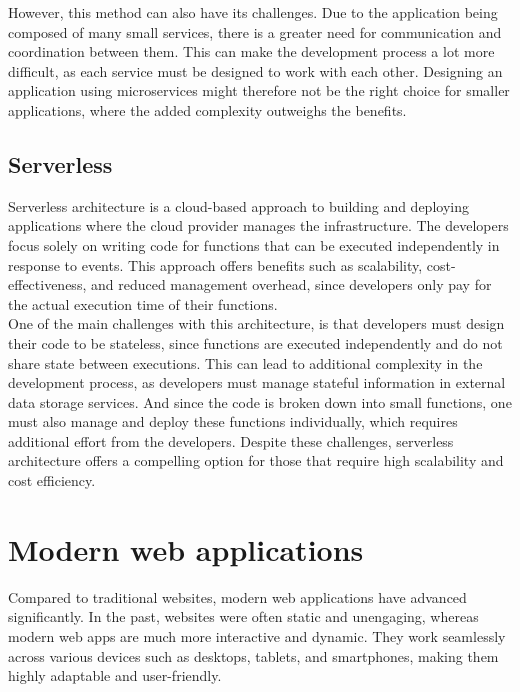 \noindent
However, this method can also have its challenges. Due to the application being composed of many small services, there is a greater need for communication and coordination between them. This can make the development process a lot more difficult, as each service must be designed to work with each other. Designing an application using microservices might therefore not be the right choice for smaller applications, where the added complexity outweighs the benefits.

\subsection{Serverless}
\label{sec:serverless}

\noindent
Serverless architecture is a cloud-based approach to building and deploying applications where the cloud provider manages the infrastructure. The developers focus solely on writing code for functions that can be executed independently in response to events. This approach offers benefits such as scalability, cost-effectiveness, and reduced management overhead, since developers only pay for the actual execution time of their functions. \cite{cassel2022serverless} \\

\noindent
One of the main challenges with this architecture, is that developers must design their code to be stateless, since functions are executed independently and do not share state between executions. This can lead to additional complexity in the development process, as developers must manage stateful information in external data storage services. And since the code is broken down into small functions, one must also manage and deploy these functions individually, which  requires additional effort from the developers. Despite these challenges, serverless architecture offers a compelling option for those that require high scalability and cost efficiency. \\


\section{Modern web applications}

Compared to traditional websites, modern web applications have advanced significantly. In the past, websites were often static and unengaging, whereas modern web apps are much more interactive and dynamic. They work seamlessly across various devices such as desktops, tablets, and smartphones, making them highly adaptable and user-friendly. \\ 

